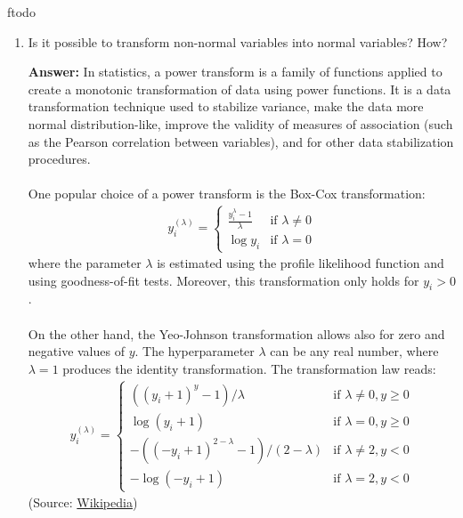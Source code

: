 ƒtodo\documentclass{article}
\newenvironment{QandA}{\begin{enumerate}[label=\arabic*.]}{\end{enumerate}}
\newenvironment{answer}{\par\normalfont \textbf{Answer:}}{}
\begin{document}
\begin{QandA}
    \item Is it possible to transform non-normal variables into normal variables? How?
    \begin{answer}
        In statistics, a power transform is a family of functions applied to create a monotonic transformation of data using power functions. It is a data transformation technique used to stabilize variance, make the data more normal distribution-like, improve the validity of measures of association (such as the Pearson correlation between variables), and for other data stabilization procedures.\\\\
        One popular choice of a power transform is the Box-Cox transformation:
        \begin{align*}
            y_i^{(\lambda)} = \begin{cases}
                \frac{y_i^\lambda - 1}{\lambda} &\text{if }\lambda \neq 0\\
                \log y_i &\text{if } \lambda = 0
            \end{cases}
        \end{align*}
        where the parameter $\lambda$ is estimated using the profile likelihood function and using goodness-of-fit tests. Moreover, this transformation only holds for $y_i > 0$. \\\\
        On the other hand, the Yeo-Johnson transformation allows also for zero and negative values of $y$. The hyperparameter $\lambda$ can be any real number, where $\lambda=1$ produces the identity transformation. The transformation law reads:
        \begin{align*}
            y_i^{(\lambda)} = \begin{cases}
                ((y_i+1)^y - 1)/\lambda &\text{if } \lambda \neq 0, y \ge 0 \\
                \log (y_i + 1) &\text{if } \lambda = 0, y \ge 0 \\
                -((-y_i + 1)^{2-\lambda} -1)/(2-\lambda) &\text{if } \lambda \neq 2, y < 0 \\
                - \log(-y_i + 1) &\text{if } \lambda = 2, y < 0
            \end{cases}
        \end{align*}
        (Source: \href{https://en.wikipedia.org/wiki/Power_transform}{Wikipedia})
    \end{answer}


\end{QandA}
\end{document}
